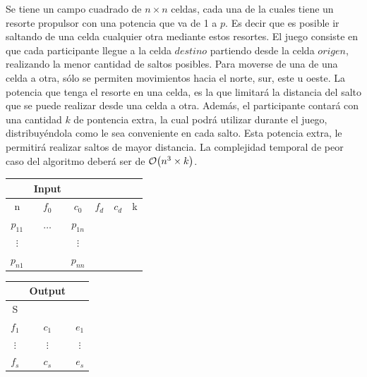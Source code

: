 \documentclass[11pt, a4paper, twoside]{article}
\begin{document}
{}
Se tiene un campo cuadrado de $n \times n$ celdas, cada una de la cuales tiene un resorte propulsor con 
una potencia que va de 1 a $p$. Es decir que es posible ir saltando de una celda cualquier otra mediante estos 
resortes. El juego consiste en que cada participante llegue a la celda $destino$ partiendo 
desde la celda $origen$, realizando la menor cantidad de saltos posibles. Para moverse de una de una celda a otra, 
sólo se permiten movimientos hacia el norte, sur, este u oeste. La potencia que tenga el resorte en una celda, 
es la que limitará la distancia del salto que se puede realizar desde una celda a otra. Además, el participante 
contará con una cantidad $k$ de pontencia extra, la cual podrá utilizar durante el juego, distribuyéndola como le 
sea conveniente en cada salto. Esta potencia extra, le permitirá realizar saltos de mayor distancia. 
La complejidad temporal de peor caso del algoritmo deberá ser de $\mathop{}\mathopen{}\mathcal{O}\mathopen{}\left({n^3} \times k\right)$. \\


	\begin{center}
		\begin{minipage}{0.5\textwidth}
			\begin{tabular}{cccccc}
			   & Input \\
			   \hline 
			   n        & $f_{0}$  & $c_{0}$   & $f_{d}$ & $c_{d}$ & k \\
			   $p_{11}$ & $\hdots$ & $p_{1n}$  &&& \\
			   $\vdots$ &          &  $\vdots$ &&& \\
			   $p_{n1}$ &        &  $p_{nn}$   &&& \\
			\end{tabular}
		\end{minipage} 
		\begin{minipage}{0.1\textwidth}
			\begin{tabular}{ccc}
					& Output \\
				   \hline
				   S &   &   \\
				   $f_1$ & $c_1$ & $e_1$ \\
				   $\vdots$ & $\vdots$& $\vdots$\\
				   $f_s$ & $c_s$ & $e_s$ \\
			\end{tabular}
		\end{minipage} 	
	 \end{center} 
	
\end{document}
